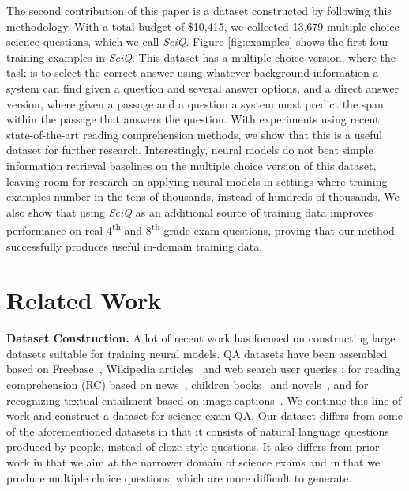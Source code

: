 The second contribution of this paper is a dataset constructed by following this methodology.  With a total budget of \$10,415, we collected 13,679 multiple choice science questions, which we call
\emph{SciQ}. Figure \ref{fig:examples} shows the first four training examples in \emph{SciQ}.  This dataset has a multiple choice version, where the task is to select the correct answer using whatever background information a system can find given a question and several answer options, and a direct answer version, where given a passage and a question a system must predict the span within the passage that answers the question.  With experiments using recent state-of-the-art reading comprehension methods, we show that this is a useful dataset for further research.  Interestingly, neural models do not beat simple information retrieval baselines on the multiple choice version of this dataset, leaving room for research on applying neural models in settings where training examples number in the tens of thousands, instead of hundreds of thousands.  We also show that using \emph{SciQ} as an additional source of training data improves performance on real 4\textsuperscript{th} and
8\textsuperscript{th} grade exam questions, proving that our method successfully produces useful in-domain training data.

\section{Related Work}

\textbf{Dataset Construction.} A lot of recent work has focused on constructing large datasets suitable for training neural models.  QA datasets have been assembled based on Freebase~\cite{Berant13WebQuestions,Bordes2015SimpleQuestions}, Wikipedia articles~\cite{Yi2015WikiQA,rajpurkar2016SQUAD,Hewlett2016WikiReading} and web search user queries \cite{Nguyen2016MSMARCO}; for reading comprehension (RC) based on news~\cite{Hermann2015News,Onishi2016Who}, children books~\cite{Hill2015CBT} and novels~\cite{paperno2016lambada}, and for recognizing textual entailment based on image captions~\cite{Bowman2015SNLI}. We continue this line of work and construct a dataset for science exam QA. Our dataset differs from some of the aforementioned datasets in that it consists of natural language questions produced by people, instead of cloze-style questions.  It also differs from prior work in that we aim at the narrower domain of science exams and in that we produce multiple choice questions, which are more difficult to generate.

